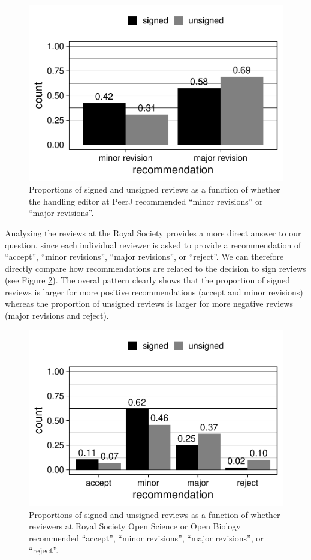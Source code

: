 \documentclass[,jou, a4paper,floatsintext]{apa6}
\begin{document}
\begin{figure}
\centering
\includegraphics{open_peer_review_files/figure-latex/PeerJrec-1.pdf}
\caption{\label{fig:PeerJrec}Proportions of signed and unsigned reviews as a function of whether the handling editor at PeerJ recommended \enquote{minor revisions} or \enquote{major revisions}.}
\end{figure}

Analyzing the reviews at the Royal Society provides a more direct answer to our question, since each individual reviewer is asked to provide a recommendation of \enquote{accept}, \enquote{minor revisions}, \enquote{major revisions}, or \enquote{reject}. We can therefore directly compare how recommendations are related to the decision to sign reviews (see Figure \ref{fig:TRSrec}). The overal pattern clearly shows that the proportion of signed reviews is larger for more positive recommendations (accept and minor revisions) whereas the proportion of unsigned reviews is larger for more negative reviews (major revisions and reject).

\begin{figure}
\centering
\includegraphics{open_peer_review_files/figure-latex/TRSrec-1.pdf}
\caption{\label{fig:TRSrec}Proportions of signed and unsigned reviews as a function of whether reviewers at Royal Society Open Science or Open Biology recommended \enquote{accept}, \enquote{minor revisions}, \enquote{major revisions}, or \enquote{reject}.}
\end{figure}
\end{document}
